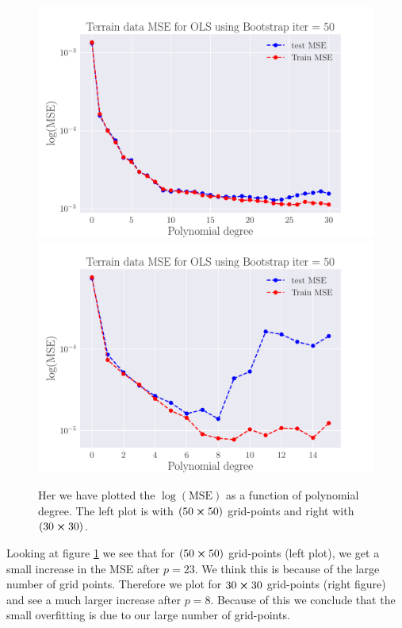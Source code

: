 \documentclass[reprint,english,notitlepage,aps,nobalancelastpage,nofootinbib]{revtex4-1}  %
\begin{document}
\begin{figure}[H]
  \includegraphics[width=\linewidth]{SRTM_MSE_OLS_n50_pol30_Bootstrap_re50_log.pdf}
  \endminipage\hfill
  \includegraphics[width=\linewidth]{SRTM_MSE_OLS_n30_pol15_Bootstrap_re50_log.pdf}
  \endminipage
  \caption{Her we have plotted the $\log(\text{MSE})$ as a function of polynomial degree. The left plot is with $(50\cross50)$ grid-points and right with $(30\cross30)$.}
  \label{fig:terrain_OLS_MSE_bootstrap}
\end{figure}

Looking at figure \ref{fig:terrain_OLS_MSE_bootstrap} we see that for $(50\cross50)$ grid-points (left plot), we get a small increase in the MSE after $p = 23$. We think this is because of the large number of grid points. Therefore we plot for $30\cross30$ grid-points (right figure) and see a much larger increase after $p = 8$. Because of this we conclude that the small overfitting is due to our large number of grid-points.
\end{document}
